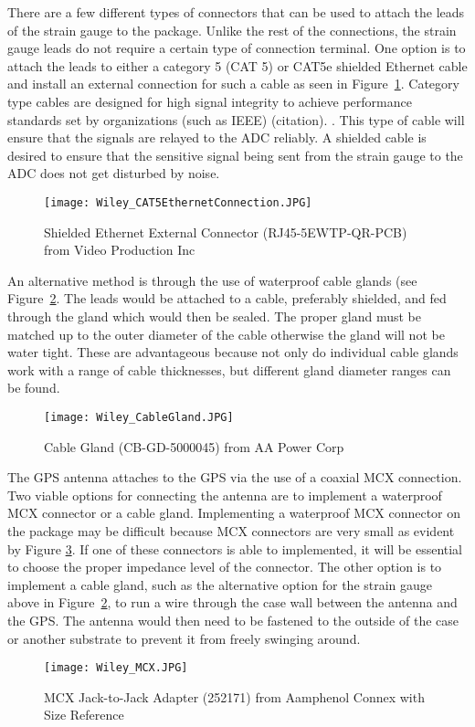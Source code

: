 There are a few different types of connectors that can be used to attach the leads of the strain gauge to the package. Unlike the rest of the
connections, the strain gauge leads do not require a certain type of connection terminal. One option is to attach the leads to either a category 5 (CAT
5) or CAT5e shielded Ethernet cable and install an external connection for such a cable as seen in Figure~\ref{fig:CAT5}. Category type cables are
designed for high signal integrity to achieve performance standards set by organizations (such as IEEE) (citation). . This type of cable will ensure that the signals are relayed to the ADC reliably. A shielded cable is desired to
ensure that the sensitive signal being sent from the strain gauge to the ADC does not get disturbed by noise. 
\begin{figure}[h]
\centering
\texttt{[image: Wiley\_CAT5EthernetConnection.JPG]}
\caption{\label{fig:CAT5} Shielded Ethernet External Connector (RJ45-5EWTP-QR-PCB) from Video Production Inc}
\end{figure}

An alternative method is through the use of waterproof cable glands (see Figure~\ref{fig:Cable Gland}. The leads would be attached to a cable, preferably
shielded, and fed through the gland which would then be sealed. The proper gland must be matched up to the outer diameter of the cable otherwise the
gland will not be water tight. These are advantageous because not only do individual cable glands work with a range of cable thicknesses, but different
gland diameter ranges can be found. 
\begin{figure}[ht]
\centering
\texttt{[image: Wiley\_CableGland.JPG]}
\caption{\label{fig:Cable Gland} Cable Gland (CB-GD-5000045) from AA Power Corp}
\end{figure}


The GPS antenna attaches to the GPS via the use of a coaxial MCX connection. Two viable options for connecting the antenna are to implement a waterproof
MCX connector or a cable gland. Implementing a waterproof MCX connector on the package may be difficult because MCX connectors are very small as evident
by Figure \ref{fig:MCX}. If one of these connectors is able to implemented, it will be essential to choose the proper impedance level of the
connector. The other option is to implement a cable gland, such as the alternative option for the strain gauge above in Figure~\ref{fig:Cable Gland},
to run a wire through the case wall between the antenna and the GPS. The antenna would then need to be fastened to the outside of the case or another
substrate to prevent it from freely swinging around. 
\begin{figure}[ht]
\centering
\texttt{[image: Wiley\_MCX.JPG]}
\caption{\label{fig:MCX} MCX Jack-to-Jack Adapter (252171) from Aamphenol Connex with Size Reference}
\end{figure}


